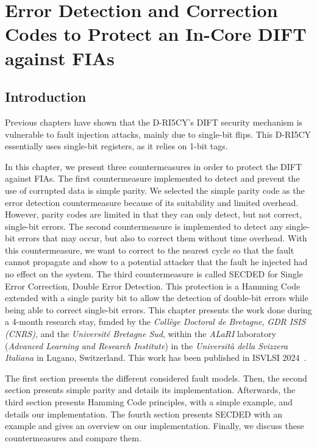 \chapter{Error Detection and Correction Codes to Protect an In-Core DIFT against FIAs}
\label{chapter:countermeasures}
\minitoc

\section{Introduction}
Previous chapters have shown that the D-RI5CY's DIFT security mechanism is vulnerable to fault injection attacks, mainly due to single-bit flips. This D-RI5CY essentially uses single-bit registers, as it relies on 1-bit tags.

In this chapter, we present three countermeasures in order to protect the DIFT against FIAs.
The first countermeasure implemented to detect and prevent the use of corrupted data is simple parity. We selected the simple parity code as the error detection countermeasure because of its suitability and limited overhead. However, parity codes are limited in that they can only detect, but not correct, single-bit errors.
The second countermeasure is implemented to detect any single-bit errors that may occur, but also to correct them without time overhead. With this countermeasure, we want to correct to the nearest cycle so that the fault cannot propagate and show to a potential attacker that the fault he injected had no effect on the system.
The third countermeasure is called SECDED for Single Error Correction, Double Error Detection. This protection is a Hamming Code extended with a single parity bit to allow the detection of double-bit errors while being able to correct single-bit errors.
This chapter presents the work done during a 4-month research stay, funded by the \textit{Collège Doctoral de Bretagne}, \textit{GDR ISIS (CNRS)}, and the \textit{Université Bretagne Sud}, within the \textit{ALaRI} laboratory (\textit{Advanced Learning and Research Institute}) in the \textit{Università della Svizzera Italiana} in Lugano, Switzerland.
This work has been published in ISVLSI 2024~\cite{PRLG-24-isvlsi}.

The first section presents the different considered fault models. Then, the second section presents simple parity and details its implementation. Afterwards, the third section presents Hamming Code principles, with a simple example, and details our implementation. The fourth section presents SECDED with an example and gives an overview on our implementation. Finally, we discuss these countermeasures and compare them.

